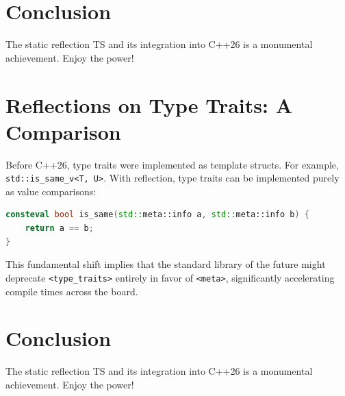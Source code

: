 \section{Conclusion}
The static reflection TS and its integration into C++26 is a monumental achievement. Enjoy the power!

\section{Reflections on Type Traits: A Comparison}

Before C++26, type traits were implemented as template structs. For example, \texttt{std::is_same_v<T, U>}.
With reflection, type traits can be implemented purely as value comparisons:
\begin{lstlisting}[language=C++]
consteval bool is_same(std::meta::info a, std::meta::info b) {
    return a == b;
}
\end{lstlisting}
This fundamental shift implies that the standard library of the future might deprecate \texttt{<type_traits>} entirely in favor of \texttt{<meta>}, significantly accelerating compile times across the board.

\section{Conclusion}
The static reflection TS and its integration into C++26 is a monumental achievement. Enjoy the power!

